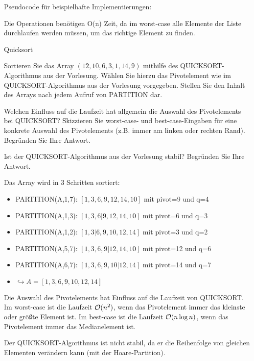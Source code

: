 \documentclass{article}
\begin{document}
\begin{solutions}
  \item Pseudocode für beispielhafte Implementierungen:\par
  
  

  \item Die Operationen benötigen O(n) Zeit, da im worst-case alle Elemente der Liste durchlaufen werden müssen, um das richtige Element zu finden.
\end{solutions}

\begin{exercises}{Quicksort}
\item Sortieren Sie das Array $(12, 10, 6, 3, 1, 14, 9)$ mithilfe des QUICKSORT-Algorithmus aus der Vorlesung. Wählen Sie hierzu das Pivotelement wie im QUICKSORT-Algorithmus aus der Vorlesung vorgegeben. Stellen Sie den Inhalt des Arrays nach jedem Aufruf von PARTITION dar.
\item Welchen Einfluss auf die Laufzeit hat allgemein die Auswahl des Pivotelements bei QUICKSORT? Skizzieren Sie worst-case- und best-case-Eingaben für eine konkrete Auswahl des Pivotelements (z.B. immer am linken oder rechten Rand). Begründen Sie Ihre Antwort.
\item Ist der QUICKSORT-Algorithmus aus der Vorlesung stabil? Begründen Sie Ihre Antwort.
\end{exercises}

\begin{solutions}
  \item Das Array wird in 3 Schritten sortiert:
  \begin{itemize}
    \item PARTITION(A,1,7): $[1,3,6,9,12,14,10]$ mit pivot=9 und q=4
    \item PARTITION(A,1,3): $[1,3,6|9,12,14,10]$ mit pivot=6 und q=3
    \item PARTITION(A,1,2): $[1,3|6,9,10,12,14]$ mit pivot=3 und q=2
    \item PARTITION(A,5,7): $[1,3,6,9|12,14,10]$ mit pivot=12 und q=6
    \item PARTITION(A,6,7): $[1,3,6,9,10|12,14]$ mit pivot=14 und q=7
    \item[] $\hookrightarrow A = [1,3,6,9,10,12,14]$
  \end{itemize}
  \item Die Auswahl des Pivotelements hat Einfluss auf die Laufzeit von QUICKSORT. Im worst-case ist die Laufzeit $\mathcal{O}(n^2)$, wenn das Pivotelement immer das kleinste oder größte Element ist. Im best-case ist die Laufzeit $\mathcal{O}(n \log n)$, wenn das Pivotelement immer das Medianelement ist.
  \item Der QUICKSORT-Algorithmus ist nicht stabil, da er die Reihenfolge von gleichen Elementen verändern kann (mit der Hoare-Partition).
\end{solutions}
\end{document}
